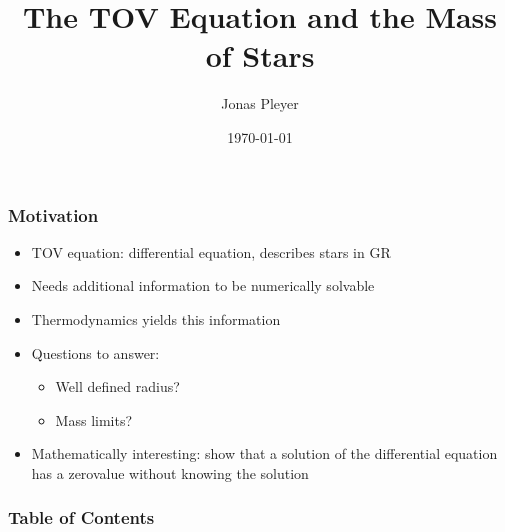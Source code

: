 \documentclass{beamer}
\title[TOV Equation and Star Masses]{The TOV Equation and the Mass of Stars}
\author[Jonas Pleyer]{Jonas Pleyer}
\date{\today}
\begin{document}
\begin{frame}
  \titlepage
\end{frame}

\begin{frame}
	\frametitle{Motivation}
	\begin{itemize}[<+->]
		\item TOV equation: differential equation, describes stars in GR
		\item Needs additional information to be numerically solvable
		\item Thermodynamics yields this information
		\item Questions to answer:
		\begin{itemize}
			\item Well defined radius?
			\item Mass limits?
		\end{itemize}
		\item Mathematically interesting: show that a solution of the differential equation has a zerovalue without knowing the solution
	\end{itemize}
\end{frame}


\begin{frame}
    \frametitle{Table of Contents}
	\tableofcontents[hideallsubsections,subsubsectionstyle=hide]
\end{frame}







\end{document}
